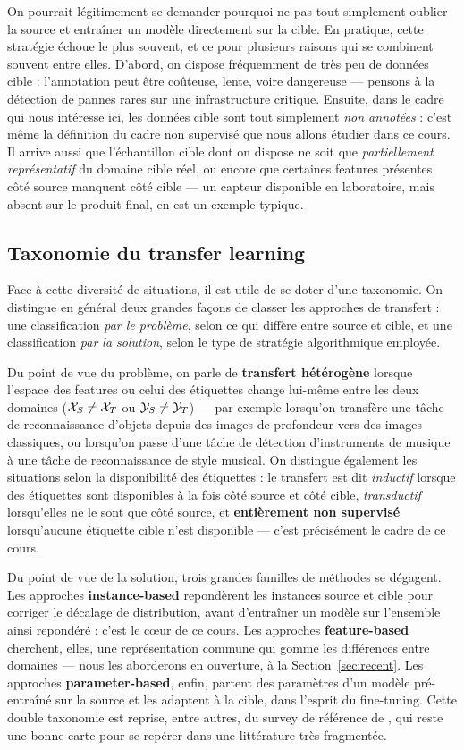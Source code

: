 \documentclass[11pt]{article}
\begin{document}
On pourrait légitimement se demander pourquoi ne pas tout simplement oublier la source et entraîner un
modèle directement sur la cible. En pratique, cette stratégie échoue le plus souvent, et ce pour
plusieurs raisons qui se combinent souvent entre elles. D'abord, on dispose fréquemment de très peu de
données cible : l'annotation peut être coûteuse, lente, voire dangereuse --- pensons à la détection de
pannes rares sur une infrastructure critique. Ensuite, dans le cadre qui nous intéresse ici, les données
cible sont tout simplement \emph{non annotées} : c'est même la définition du cadre non supervisé que
nous allons étudier dans ce cours. Il arrive aussi que l'échantillon cible dont on dispose ne soit que
\emph{partiellement représentatif} du domaine cible réel, ou encore que certaines features présentes côté
source manquent côté cible --- un capteur disponible en laboratoire, mais absent sur le produit final,
en est un exemple typique.

\subsection{Taxonomie du transfer learning}

Face à cette diversité de situations, il est utile de se doter d'une taxonomie. On distingue en général
deux grandes façons de classer les approches de transfert : une classification \emph{par le problème},
selon ce qui diffère entre source et cible, et une classification \emph{par la solution}, selon le type
de stratégie algorithmique employée.

Du point de vue du problème, on parle de \textbf{transfert hétérogène} lorsque l'espace des features ou
celui des étiquettes change lui-même entre les deux domaines ($\mathcal{X}_S\neq \mathcal{X}_T$ ou $\mathcal{Y}_S\neq \mathcal{Y}_T$) --- par
exemple lorsqu'on transfère une tâche de reconnaissance d'objets depuis des images de profondeur vers des
images classiques, ou lorsqu'on passe d'une tâche de détection d'instruments de musique à une tâche de
reconnaissance de style musical. On distingue également les situations selon la disponibilité des
étiquettes : le transfert est dit \emph{inductif} lorsque des étiquettes sont disponibles à la fois côté
source et côté cible, \emph{transductif} lorsqu'elles ne le sont que côté source, et \textbf{entièrement
non supervisé} lorsqu'aucune étiquette cible n'est disponible --- c'est précisément le cadre de ce cours.

Du point de vue de la solution, trois grandes familles de méthodes se dégagent. Les approches
\textbf{instance-based} repondèrent les instances source et cible pour corriger le décalage de
distribution, avant d'entraîner un modèle sur l'ensemble ainsi repondéré : c'est le cœur de ce cours. Les
approches \textbf{feature-based} cherchent, elles, une représentation commune qui gomme les différences
entre domaines --- nous les aborderons en ouverture, à la Section~\ref{sec:recent}. Les approches
\textbf{parameter-based}, enfin, partent des paramètres d'un modèle pré-entraîné sur la source et les
adaptent à la cible, dans l'esprit du fine-tuning. Cette double taxonomie est reprise, entre autres, du
survey de référence de \citet{zhuang2021comprehensive}, qui reste une bonne carte pour se repérer dans
une littérature très fragmentée.
\end{document}
